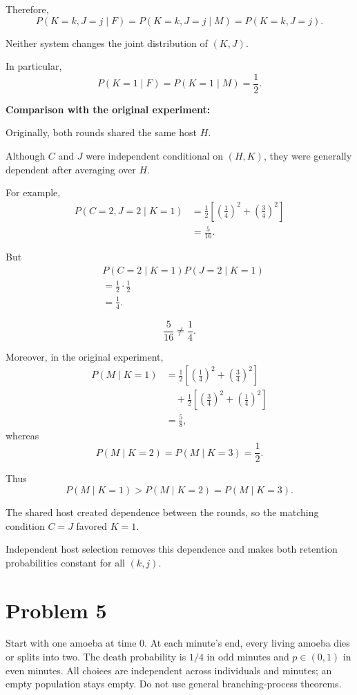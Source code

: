 \documentclass[11pt,a4paper]{article}
\newcommand{\Prob}{P}
\begin{document}
Therefore,
\[
\Prob(K=k,J=j\mid F)
=
\Prob(K=k,J=j\mid M)
=
\Prob(K=k,J=j).
\]

Neither system changes the joint distribution of $(K,J)$.

In particular,
\[
\Prob(K=1\mid F)
=
\Prob(K=1\mid M)
=
\frac12.
\]

\medskip
\textbf{Comparison with the original experiment:}

Originally, both rounds shared the same host $H$.

Although $C$ and $J$ were independent conditional on
$(H,K)$, they were generally dependent after averaging over $H$.

For example,
\[
\begin{aligned}
\Prob(C=2,J=2\mid K=1)
&=\frac12
\left[
\left(\frac14\right)^2+
\left(\frac34\right)^2
\right]\\
&=\frac5{16}.
\end{aligned}
\]

But
\[
\begin{aligned}
&\Prob(C=2\mid K=1)\Prob(J=2\mid K=1)\\
&=\frac12\cdot\frac12\\
&=\frac14.
\end{aligned}
\]

\[
\frac5{16}\neq\frac14.
\]

Moreover, in the original experiment,
\[
\begin{aligned}
\Prob(M\mid K=1)
&=\frac12
\left[
\left(\frac14\right)^2+
\left(\frac34\right)^2
\right]\\
&\quad+
\frac12
\left[
\left(\frac34\right)^2+
\left(\frac14\right)^2
\right]\\
&=\frac58,
\end{aligned}
\]
whereas
\[
\Prob(M\mid K=2)
=
\Prob(M\mid K=3)
=
\frac12.
\]

Thus
\[
\Prob(M\mid K=1)
>
\Prob(M\mid K=2)
=
\Prob(M\mid K=3).
\]

The shared host created dependence between the rounds,
so the matching condition $C=J$ favored $K=1$.

Independent host selection removes this dependence and makes
both retention probabilities constant for all $(k,j)$.




\clearpage
\section*{Problem 5}

Start with one amoeba at time $0$. At each minute's end, every living
amoeba dies or splits into two. The death probability is $1/4$ in odd
minutes and $p\in(0,1)$ in even minutes. All choices are independent
across individuals and minutes; an empty population stays empty.
Do not use general branching-process theorems.
\end{document}
